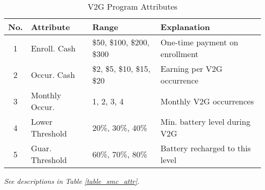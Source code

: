 \begin{table}[H]
\centering
\caption{V2G Program Attributes}
\begin{tabular}{clll}
\toprule
\textbf{No.} & \textbf{Attribute} & \textbf{Range} & \textbf{Explanation}\\
\midrule
1 & Enroll. Cash & \$50, \$100, \$200, \$300 & One-time payment on enrollment\\
2 & Occur. Cash & \$2, \$5, \$10, \$15, \$20 & Earning per V2G occurrence\\
3 & Monthly Occur. & 1, 2, 3, 4 & Monthly V2G occurrences\\
4 & Lower Threshold & 20\%, 30\%, 40\% & Min. battery level during V2G\\
5 & Guar. Threshold & 60\%, 70\%, 80\% & Battery recharged to this level\\
\bottomrule
\end{tabular}
\begin{tablenotes}
\footnotesize
\item [] \textit{See descriptions in Table \ref{table_smc_attr}.}
\end{tablenotes}
\label{table_v2g_attr}
\end{table}